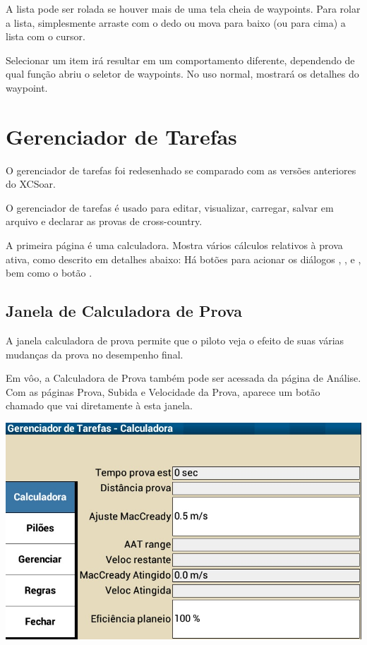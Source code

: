 A lista pode ser rolada se houver mais de uma tela cheia de waypoints.  Para rolar a lista, simplesmente arraste com o dedo ou mova para baixo (ou para cima) a lista com o cursor. 

Selecionar um item irá resultar em um comportamento diferente, dependendo de qual função abriu o seletor de waypoints.  No uso normal, mostrará os detalhes do waypoint.

\section{Gerenciador de Tarefas}\label{sec:task-manager-dialog}
\begin{it}  O gerenciador de tarefas foi redesenhado se comparado com as versões anteriores do XCSoar.\end{it}

O gerenciador de tarefas é usado para editar, visualizar, carregar, salvar em arquivo e declarar as provas de cross-country.

A primeira página é uma calculadora.  Mostra vários cálculos relativos à prova ativa, como descrito em detalhes abaixo:  Há botões para acionar os diálogos , , 
e , bem como o botão  .

\subsection*{Janela de Calculadora de Prova}\label{sec:task-calc-dial}
A janela calculadora de prova permite que o piloto veja o efeito de suas várias mudanças da prova no desempenho final.

Em vôo, a Calculadora de Prova também pode ser acessada da página de Análise.  Com as páginas Prova, Subida e Velocidade da Prova, aparece um botão chamado   que vai diretamente à esta janela.
 



\begin{center}
\includegraphics[angle=0,width=0.8\linewidth,keepaspectratio='true']{figures/dialog-taskcalculator.png}
\end{center}

